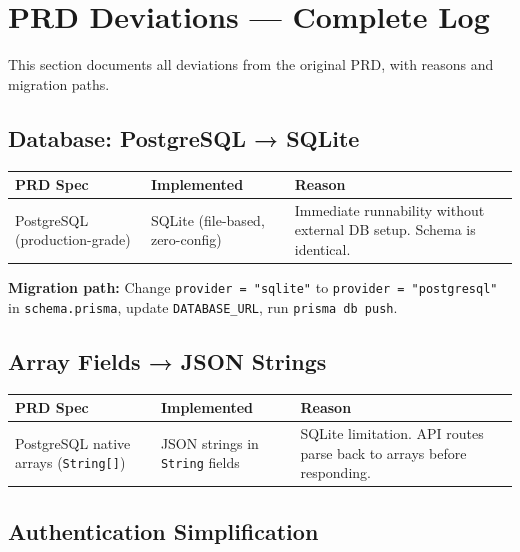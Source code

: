 \documentclass[12pt,a4paper]{article}
\begin{document}
\newpage

\section{PRD Deviations — Complete Log}

This section documents all deviations from the original PRD, with reasons and migration paths.

\subsection{Database: PostgreSQL → SQLite}

\begin{center}
\begin{tabular}{p{4cm}p{4cm}p{5cm}}
\toprule
\textbf{PRD Spec} & \textbf{Implemented} & \textbf{Reason} \\
\midrule
PostgreSQL (production-grade) & SQLite (file-based, zero-config) & Immediate runnability without external DB setup. Schema is identical. \\
\bottomrule
\end{tabular}
\end{center}

\textbf{Migration path:} Change \texttt{provider = "sqlite"} to \texttt{provider = "postgresql"} in \texttt{schema.prisma}, update \texttt{DATABASE\_URL}, run \texttt{prisma db push}.

\subsection{Array Fields → JSON Strings}

\begin{center}
\begin{tabular}{p{4cm}p{4cm}p{5cm}}
\toprule
\textbf{PRD Spec} & \textbf{Implemented} & \textbf{Reason} \\
\midrule
PostgreSQL native arrays (\texttt{String[]}) & JSON strings in \texttt{String} fields & SQLite limitation. API routes parse back to arrays before responding. \\
\bottomrule
\end{tabular}
\end{center}

\subsection{Authentication Simplification}
\end{document}
